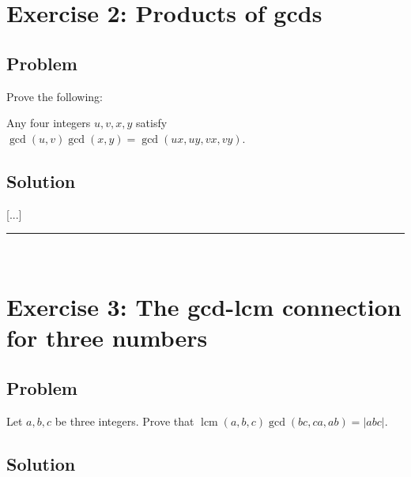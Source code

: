 \documentclass[paper=a4, fontsize=12pt]{scrartcl} %
\newcommand{\lcm}{\operatorname{lcm}}
\newcommand{\abs}[1]{\left| #1 \right|}
\newcommand{\tup}[1]{\left( #1 \right)}
\newcommand{\horrule}[1]{\rule{\linewidth}{#1}} %
\theoremstyle{plainsl}
\theoremstyle{definition}
\theoremstyle{remark}
\begin{document}
\section{Exercise 2: Products of gcds}

\subsection{Problem}

Prove the following:


Any four integers $u, v, x, y$ satisfy
$\gcd\tup{u, v} \gcd\tup{x, y}
= \gcd\tup{ux, uy, vx, vy}$.




\subsection{Solution}

[...]

\horrule{0.3pt} \\[0.4cm]

\section{Exercise 3: The gcd-lcm connection for three numbers}

\subsection{Problem}

Let $a, b, c$ be three integers.
Prove that $\lcm\tup{a, b, c} \gcd\tup{bc, ca, ab} = \abs{abc}$.

\subsection{Solution}
\end{document}
